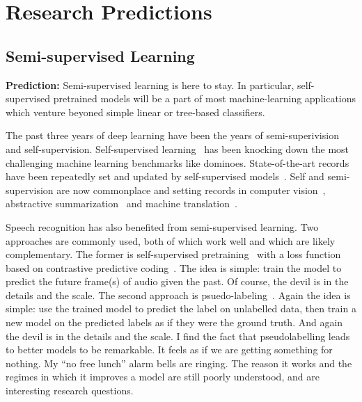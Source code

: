 \section{Research Predictions}
\label{sec:research_predictions}

\subsection{Semi-supervised Learning}

{\bf Prediction:} Semi-supervised learning is here to stay. In particular,
self-supervised pretrained models will be a part of most machine-learning
applications which venture beyoned simple linear or tree-based classifiers.

The past three years of deep learning have been the years of semi-superivision
and self-supervision. Self-supervised learning~\cite{lecun2021self} has been
knocking down the most challenging machine learning benchmarks like dominoes.
State-of-the-art records have been repeatedly set and updated by
self-supervised models~\citep{devlin2019bert, radford2019language,
yang2019xlnet}. Self and semi-supervision are now commonplace and setting
records in computer vision~\citep{he2020momentum, chen2020simple,
grill2020bootstrap}, abstractive summarization~\citep{zhang2020pegasus} and
machine translation~\citep{sennrich2016improving}.

Speech recognition has also benefited from semi-supervised learning. Two
approaches are commonly used, both of which work well and which are likely
complementary. The former is self-supervised
pretraining~\citep{schneider2019wav2vec, zhang2020pushing} with a loss function
based on contrastive predictive coding~\citep{oord2018representation}. The idea
is simple: train the model to predict the future frame(s) of audio given the
past. Of course, the devil is in the details and the scale. The second approach
is psuedo-labeling~\citep{lee2013pseudo, kahn2020self, xu2020iterative}. Again
the idea is simple: use the trained model to predict the label on unlabelled
data, then train a new model on the predicted labels as if they were the ground
truth. And again the devil is in the details and the scale. I find the fact
that pseudolabelling leads to better models to be remarkable. It feels as if we
are getting something for nothing. My ``no free lunch'' alarm bells are
ringing. The reason it works and the regimes in which it improves a model are
still poorly understood, and are interesting research questions.

